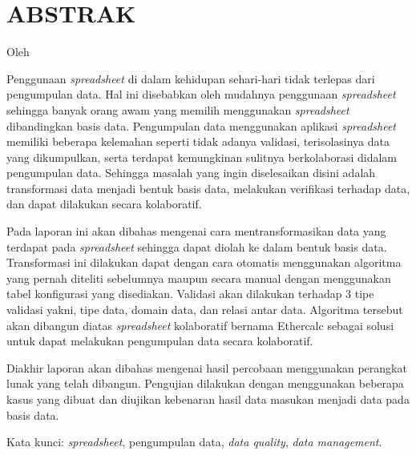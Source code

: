 \clearpage
\chapter*{ABSTRAK}
\begin{center}
\MakeTextUppercase{\textbf{\large{\thetitle}}}

Oleh

\MakeTextUppercase{\theauthor}
\end{center}
\medskip
\begin{spacing}{1.0}
Penggunaan \textit{spreadsheet} di dalam kehidupan sehari-hari tidak terlepas dari pengumpulan data. Hal ini disebabkan oleh mudahnya penggunaan \textit{spreadsheet} sehingga banyak orang awam yang memilih menggunakan \textit{spreadsheet} dibandingkan basis data. Pengumpulan data menggunakan aplikasi \textit{spreadsheet} memiliki beberapa kelemahan seperti tidak adanya validasi, terisolasinya data yang dikumpulkan, serta terdapat kemungkinan sulitnya berkolaborasi didalam pengumpulan data. Sehingga masalah yang ingin diselesaikan disini adalah transformasi data menjadi bentuk basis data, melakukan verifikasi terhadap data, dan dapat dilakukan secara kolaboratif.

Pada laporan ini akan dibahas mengenai cara mentransformasikan data yang terdapat pada \textit{spreadsheet} sehingga dapat diolah ke dalam bentuk basis data. Transformasi ini dilakukan dapat dengan cara otomatis menggunakan algoritma yang pernah diteliti sebelumnya maupun secara manual dengan menggunakan tabel konfigurasi yang disediakan. Validasi akan dilakukan terhadap 3 tipe validasi yakni, tipe data, domain data, dan relasi antar data. Algoritma tersebut akan dibangun diatas \textit{spreadsheet} kolaboratif bernama Ethercalc sebagai solusi untuk dapat melakukan pengumpulan data secara kolaboratif.

Diakhir laporan akan dibahas mengenai hasil percobaan menggunakan perangkat lunak yang telah dibangun. Pengujian dilakukan dengan menggunakan beberapa kasus yang dibuat dan diujikan kebenaran hasil data masukan menjadi data pada basis data.

Kata kunci: \textit{spreadsheet}, pengumpulan data, \textit{data quality}, \textit{data management}.
\end{spacing}

\clearpage
